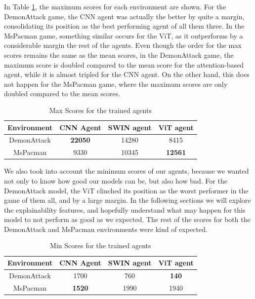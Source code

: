 In Table \ref{tab:max_final_results}, the maximum scores for each environment are shown. For the DemonAttack game, the CNN agent was actually the better by quite a margin, consolidating its position as the best performing agent of all them three. In the MsPacman game, something similar occurs for the ViT, as it outperforms by a considerable margin the rest of the agents. Even though the order for the max scores remains the same as the mean scores, in the DemonAttack game, the maximum score is doubled compared to the mean score for the attention-based agent, while it is almost tripled for the CNN agent. On the other hand, this does not happen for the MsPacman game, where the maximum scores are only doubled compared to the mean scores.

\begin{table}[!h]
	\begin{center}
		\caption[Max Scores for the trained agents]{Max Scores for the trained agents}
		\label{tab:max_final_results}
		\begin{tabular}{||c c c c||} 
			\hline
			Environment& CNN Agent & SWIN agent & ViT agent \\ [0.5ex] 
			\hline\hline
			DemonAttack& \textbf{22050} & 14280 & 8415 \\ 
			\hline
			MsPacman & 9330 &  10345 & \textbf{12561} \\
			\hline
		\end{tabular}
	\end{center}
\end{table}

We also took into account the minimum scores of our agents, because we wanted not only to know how good our models can be, but also how bad. For the DemonAttack model, the ViT clinched its position as the worst performer in the game of them all, and by a large margin. In the following sections we will explore the explainability features, and hopefully understand what may happen for this model to not perform as good as we expected. The rest of the scores for both the DemonAttack and MsPacman environments were kind of expected.

\begin{table}[!h]
	\begin{center}
		\caption[Min Scores for the trained agents]{Min Scores for the trained agents}
		\label{tab:min_final_results}
		\begin{tabular}{||c c c c||} 
			\hline
			Environment& CNN Agent & SWIN agent & ViT agent \\ [0.5ex] 
			\hline\hline
			DemonAttack& 1700 & 760 & \textbf{140} \\ 
			\hline
			MsPacman & \textbf{1520} &  1990 & 1940 \\
			\hline
		\end{tabular}
	\end{center}
\end{table}

